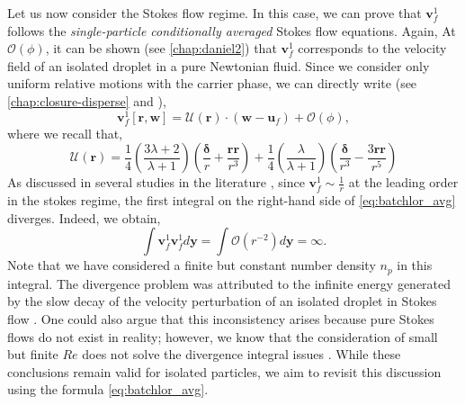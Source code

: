 Let us now consider the Stokes flow regime. 
In this case, we can prove that $\textbf{v}_f^{1}$ follows the \textit{single-particle conditionally averaged} Stokes flow equations. 
Again, At $\mathcal{O}(\phi)$, it can be shown (see \ref{chap:daniel2}) that $\textbf{v}^1_f$ corresponds to the velocity field of an isolated droplet in a pure Newtonian fluid. 
Since we consider only uniform relative motions with the carrier phase, we can directly write (see \ref{chap:closure-disperse} and \citet{kim2013microhydrodynamics}), 
\begin{equation}
    \textbf{v}_f^{1}[\textbf{r},\textbf{w}]
    = 
    \mathcal{U}(\textbf{r}) \cdot (\textbf{w} - \textbf{u}_f)
    + \mathcal{O}(\phi),
    \label{eq:stokes_sol}
\end{equation}
where we recall that,
\begin{equation}
    \mathcal{U}(\textbf{r})= 
    \frac{1}{4}\left(\frac{3\lambda + 2}{\lambda +1}\right)
    \left(\frac{\bm\delta}{r} + \frac{\textbf{rr}}{r^3}\right) 
    + 
    \frac{1}{4}\left(\frac{\lambda}{\lambda +1}\right)
    \left(\frac{\bm\delta}{r^3} - \frac{3 \textbf{rr}}{r^5}\right)
    \label{eq:Umathcal}
\end{equation}
As discussed in several studies in the literature \citep{caflisch1985variance}, 
since $\textbf{v}_f^{1} \sim \frac{1}{r}$ at the leading order in the stokes regime, the first integral on the right-hand side of \ref{eq:batchlor_avg} diverges. 
Indeed, we obtain,
\begin{equation}
    \int \textbf{v}_f^{1} \textbf{v}_f^{1}  d \textbf{y} = 
    \int \mathcal{O}(r^{-2}) d \textbf{y} = \infty.
    \label{eq:non_convergence}
\end{equation}
Note that we have considered a finite but constant number density $n_p$ in this integral. 
The divergence problem was attributed to the infinite energy generated by the slow decay of the velocity perturbation of an isolated droplet in Stokes flow \citep{caflisch1985variance}. 
One could also argue that this inconsistency arises because pure Stokes flows do not exist in reality; however, we know that the consideration of small but finite $Re$ does not solve the divergence integral issues \citep{koch1993hydrodynamic}. 
While these conclusions remain valid for isolated particles, we aim to revisit this discussion using the formula \ref{eq:batchlor_avg}.


